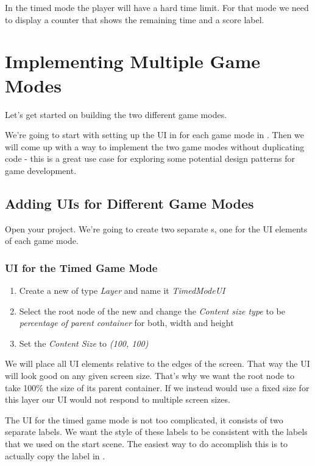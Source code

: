 In the timed mode the player will have a hard time limit. For that mode
we need to display a counter that shows the remaining time and a score label.

\section{Implementing Multiple Game Modes}
Let's get started on building the two different game modes. 

We're going to start with setting up the UI in for each game mode in \SB{}. Then
we will come up with a way to implement the two game modes without duplicating
code - this is a great use case for exploring some potential design patterns for
game development.

\subsection{Adding UIs for Different Game Modes}
Open your \SB{} project. We're going to create two separate \ccbfile{}s, one for
the UI elements of each game mode.

\subsubsection{UI for the Timed Game Mode}
\begin{leftbar}
\begin{enumerate}
  \item Create a new \ccbfile{} of type \textit{Layer} and name it
  \textit{TimedModeUI}
  \item Select the root node of the new \ccbfile{} and change the
  \textit{Content size type} to be \textit{percentage of parent container} for
  both, width and height
  \item Set the \textit{Content Size} to \textit{(100, 100)}
\end{enumerate}
\end{leftbar}

We will place all UI elements relative to the edges of the screen. That way the
UI will look good on any given screen size. That's why we want the root node to
take 100\% the size of its parent container. If we instead would use a fixed
size for this layer our UI would not respond to multiple screen sizes.

The UI for the timed game mode is not too complicated, it consists of two
separate labels. We want the style of these labels to be consistent with the
labels that we used on the start scene. The easiest way to do accomplish this is
to actually copy the label in \SB{}.

